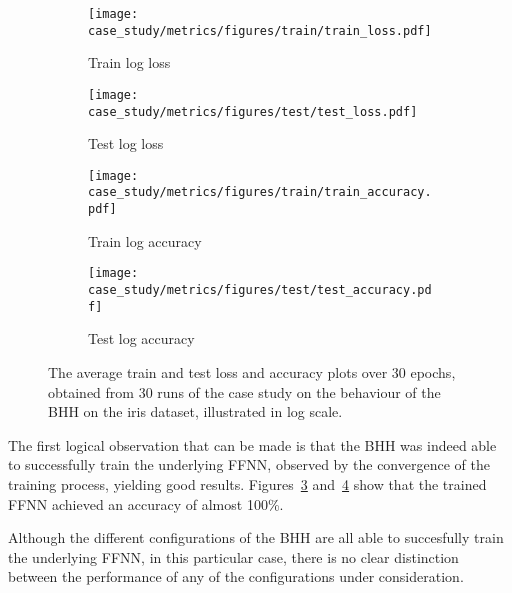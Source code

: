 \begin{figure}[htb]
      \begin{subfigure}{0.5\textwidth}
            \centering
            \texttt{[image: case\_study/metrics/figures/train/train\_loss.pdf]}
            \caption{Train log loss}
            \label{fig:results:case_study:metrics:train_loss}
      \end{subfigure}
      \begin{subfigure}{0.5\textwidth}
            \centering
            \texttt{[image: case\_study/metrics/figures/test/test\_loss.pdf]}
            \caption{Test log loss}
            \label{fig:results:case_study:metrics:test_loss}
      \end{subfigure}
      \par\bigskip
      \begin{subfigure}{0.5\textwidth}
            \centering
            \texttt{[image: case\_study/metrics/figures/train/train\_accuracy.pdf]}
            \caption{Train log accuracy}
            \label{fig:results:case_study:metrics:train_accuracy}
      \end{subfigure}
      \begin{subfigure}{0.5\textwidth}
            \centering
            \texttt{[image: case\_study/metrics/figures/test/test\_accuracy.pdf]}
            \caption{Test log accuracy}
            \label{fig:results:case_study:metrics:test_accuracy}
      \end{subfigure}
      \par\bigskip
      \caption{The average train and test loss and accuracy plots over 30 epochs, obtained from 30 runs of the case study on the behaviour of the \acs{BHH} on the iris dataset, illustrated in log scale.}
      \label{fig:results:case_study:metrics}
\end{figure}

The first logical observation that can be made is that the \acs{BHH} was indeed able to successfully train the underlying \acs{FFNN}, observed by the convergence of the training process, yielding good results. Figures~\ref{fig:results:case_study:metrics:train_accuracy} and~\ref{fig:results:case_study:metrics:test_accuracy} show that the trained \acs{FFNN} achieved an accuracy of almost 100\%.

Although the different configurations of the \acs{BHH} are all able to succesfully train the underlying \acs{FFNN}, in this particular case, there is no clear distinction between the performance of any of the configurations under consideration.

